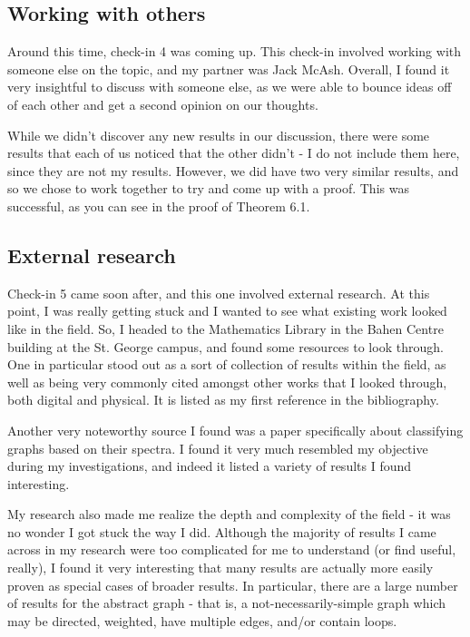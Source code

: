 \documentclass{article}
\begin{document}
\subsection{Working with others}

Around this time, check-in 4 was coming up.
This check-in involved working with someone else on the topic, and my partner was Jack McAsh.
Overall, I found it very insightful to discuss with someone else, as we were able to bounce ideas off of each other and get a second opinion on our thoughts.

While we didn't discover any new results in our discussion, there were some results that each of us noticed that the other didn't - I do not include them here, since they are not my results.
However, we did have two very similar results, and so we chose to work together to try and come up with a proof.
This was successful, as you can see in the proof of Theorem 6.1.

\subsection{External research}

Check-in 5 came soon after, and this one involved external research.
At this point, I was really getting stuck and I wanted to see what existing work looked like in the field.
So, I headed to the Mathematics Library in the Bahen Centre building at the St. George campus, and found some resources to look through.
One in particular stood out as a sort of collection of results within the field, as well as being very commonly cited amongst other works that I looked through, both digital and physical.
It is listed as my first reference in the bibliography.

Another very noteworthy source I found was a paper specifically about classifying graphs based on their spectra.
I found it very much resembled my objective during my investigations, and indeed it listed a variety of results I found interesting.

My research also made me realize the depth and complexity of the field - it was no wonder I got stuck the way I did.
Although the majority of results I came across in my research were too complicated for me to understand (or find useful, really), I found it very interesting that many results
are actually more easily proven as special cases of broader results. In particular, there are a large number of results for the abstract graph - that is, a not-necessarily-simple graph which may
be directed, weighted, have multiple edges, and/or contain loops.
\end{document}
